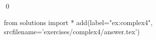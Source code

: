 
\begin{ex} 
  \label{ex:complex4}
  
  \qed
\end{ex} 
\begin{python0}
from solutions import *
add(label="ex:complex4",
    srcfilename='exercises/complex4/answer.tex') 
\end{python0}
